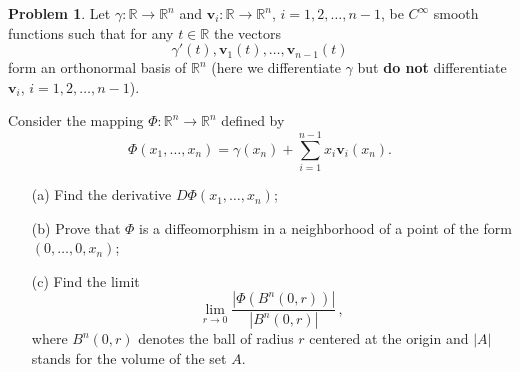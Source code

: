 \documentclass[11pt]{article}
\theoremstyle{definition}
\newtheorem{problem}{Problem}
\theoremstyle{definition}
\begin{document}
\begin{problem}
Let $\gamma:\mathbb{R}\to\mathbb{R}^n$ and $\mathbf{v}_i:\mathbb{R}\to\mathbb{R}^n$, $i=1,2,\ldots,n-1$, be $C^\infty$ smooth functions such that for any $t\in\mathbb{R}$ the vectors
$$
\gamma'(t),\mathbf{v}_1(t),\ldots,\mathbf{v}_{n-1}(t)
$$
form an orthonormal basis of $\mathbb{R}^n$ (here we differentiate $\gamma$ but {\bf do not} differentiate $\mathbf{v}_i$, $i=1,2,\ldots,n-1$).

Consider the mapping $\Phi:\mathbb{R}^n\to\mathbb{R}^n$ defined by
$$
\Phi(x_1,\ldots,x_n)=\gamma(x_n)+\sum_{i=1}^{n-1} x_i\mathbf{v}_i(x_n).
$$
\begin{itemize}
	\item[(a)] Find the derivative $D\Phi(x_1,\ldots,x_n)$;
	\item[(b)] Prove that $\Phi$ is a diffeomorphism in a neighborhood of a point of the form $(0,\ldots,0,x_n)$;
	\item[(c)] Find the limit
	$$
	\lim_{r\to 0}
	\frac{|\Phi(B^n(0,r))|}{|B^n(0,r)|}\, ,
	$$
	where $B^n(0,r)$ denotes the ball of radius $r$ centered at the origin and $|A|$ stands for the volume of the set $A$.
\end{itemize}
\end{problem}
\end{document}
